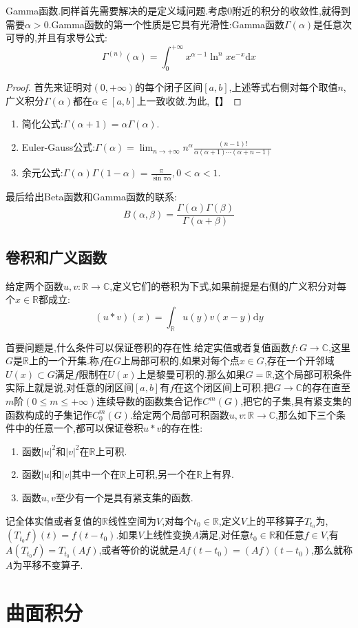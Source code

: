 Gamma函数.同样首先需要解决的是定义域问题.考虑0附近的积分的收敛性,就得到需要$\alpha>0$.Gamma函数的第一个性质是它具有光滑性:Gamma函数$\Gamma(\alpha)$是任意次可导的,并且有求导公式:
$$\Gamma^{(n)}(\alpha)=\int_0^{+\infty}x^{\alpha-1}\ln^nxe^{-x}\mathrm{d}x$$
\begin{proof}
	
	首先来证明对$(0,+\infty)$的每个闭子区间$[a,b]$,上述等式右侧对每个取值$n$,广义积分$\Gamma(\alpha)$都在$\alpha\in[a,b]$上一致收敛.为此,【】
	
\end{proof}
\begin{enumerate}
	\item 简化公式:$\Gamma(\alpha+1)=\alpha\Gamma(\alpha)$.
	\item Euler-Gauss公式:$\Gamma(\alpha)=\lim_{n\to+\infty}n^{\alpha}\frac{(n-1)!}{\alpha(\alpha+1)\cdots(\alpha+n-1)}$
	\item 余元公式:$\Gamma(\alpha)\Gamma(1-\alpha)=\frac{\pi}{\sin\pi\alpha},0<\alpha<1$.
\end{enumerate}

最后给出Beta函数和Gamma函数的联系:
$$B(\alpha,\beta)=\frac{\Gamma(\alpha)\Gamma(\beta)}{\Gamma(\alpha+\beta)}$$
\newpage
\subsection{卷积和广义函数}

给定两个函数$u,v:\mathbb{R}\to\mathbb{C}$,定义它们的卷积为下式,如果前提是右侧的广义积分对每个$x\in\mathbb{R}$都成立:
$$(u\ast v)(x)=\int_{\mathbb{R}}u(y)v(x-y)\mathrm{d}y$$

首要问题是,什么条件可以保证卷积的存在性.给定实值或者复值函数$f:G\to\mathbb{C}$,这里$G$是$\mathbb{R}$上的一个开集.称$f$在$G$上局部可积的,如果对每个点$x\in G$,存在一个开邻域$U(x)\subset G$满足$f$限制在$U(x)$上是黎曼可积的.那么如果$G=\mathbb{R}$,这个局部可积条件实际上就是说,对任意的闭区间$[a,b]$有$f$在这个闭区间上可积.把$G\to\mathbb{C}$的存在直至$m$阶$(0\le m\le+\infty)$连续导数的函数集合记作$C^m(G)$,把它的子集,具有紧支集的函数构成的子集记作$C_0^m(G)$.给定两个局部可积函数$u,v:\mathbb{R}\to\mathbb{C}$,那么如下三个条件中的任意一个,都可以保证卷积$u\ast v$的存在性:
\begin{enumerate}
	\item 函数$|u|^2$和$|v|^2$在$\mathbb{R}$上可积.
	\item 函数$|u|$和$|v|$其中一个在$\mathbb{R}$上可积,另一个在$\mathbb{R}$上有界.
	\item 函数$u,v$至少有一个是具有紧支集的函数.
\end{enumerate}




记全体实值或者复值的$\mathbb{R}$线性空间为$V$,对每个$t_0\in\mathbb{R}$,定义$V$上的平移算子$T_{t_0}$为,$(T_{t_0}f)(t)=f(t-t_0)$.如果$V$上线性变换$A$满足,对任意$t_0\in\mathbb{R}$和任意$f\in V$,有$A(T_{t_0}f)=T_{t_0}(Af)$,或者等价的说就是$Af(t-t_0)=(Af)(t-t_0)$,那么就称$A$为平移不变算子.
\newpage
\section{曲面积分}